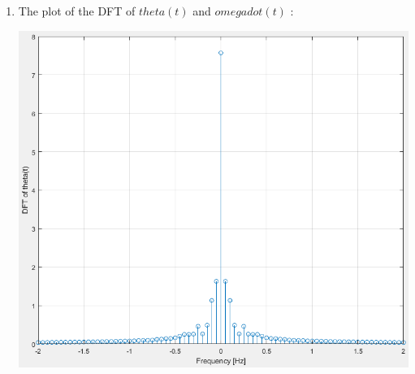 \documentclass[a4paper,12pt]{article}
\begin{document}
\begin{enumerate}[label={\color{blue}\arabic*)}]
\begin{multicols}{2}
    \end{multicols}
    To get the plots :
    \begin{lstlisting}[style=Matlab-editor,language=Matlab, basicstyle=\small\ttfamily]
t_ang=0:Te2:Te(end)-Te2;

figure(6)
plot(t_ang, theta)
xlabel('Time [sec]')
ylabel('Angular position [rad]')
grid on

figure(7)
plot(Te,wd)
xlabel('Time [sec]')
ylabel('Angular acceleration [rad/s^2]')
grid on
        \end{lstlisting}


    \item
    The plot of the DFT of \(theta(t)\) and \(omega dot(t)\) :
    \begin{multicols}{2}
    \begin{flushleft}
            \includegraphics[width=1\linewidth]{Images/DFT_theta.png}
            \label{Figure11}
        \end{flushleft}
    \columnbreak
    \begin{flushright}

\end{flushright}
\end{multicols}
\end{enumerate}
\end{document}
